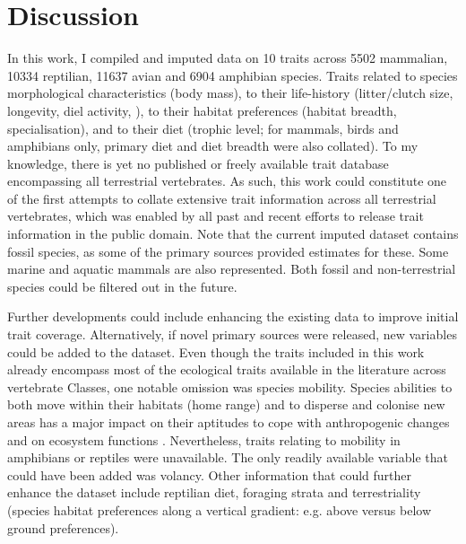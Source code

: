 \section{Discussion}


In this work, I compiled and imputed data on 10 traits across 5502 mammalian, 10334 reptilian, 11637 avian and 6904 amphibian species. Traits related to species morphological characteristics (body mass), to their life-history (litter/clutch size, longevity, diel activity, ), to their habitat preferences (habitat breadth, specialisation), and to their diet (trophic level; for mammals, birds and amphibians only, primary diet and diet breadth were also collated). To my knowledge, there is yet no published or freely available trait database encompassing all terrestrial vertebrates. As such, this work could constitute one of the first attempts to collate extensive trait information across all terrestrial vertebrates, which was enabled by all past and recent efforts to release trait information in the public domain. Note that the current imputed dataset contains fossil species, as some of the primary sources provided estimates for these. Some marine and aquatic mammals are also represented. Both fossil and non-terrestrial species could be filtered out in the future.

Further developments could include enhancing the existing data to improve initial trait coverage. Alternatively, if novel primary sources were released, new variables could be added to the dataset. Even though the traits included in this work already encompass most of the ecological traits available in the literature across vertebrate Classes, one notable omission was species mobility. Species abilities to both move within their habitats (home range) and to disperse and colonise new areas has a major impact on their aptitudes to cope with anthropogenic changes and on ecosystem functions \citep{Tucker2018, Schloss2012b}. Nevertheless, traits relating to mobility in amphibians or reptiles were unavailable. The only readily available variable that could have been added was volancy. Other  information that could further enhance the dataset include reptilian diet, foraging strata and terrestriality (species habitat preferences along a vertical gradient: e.g. above versus below ground preferences).

